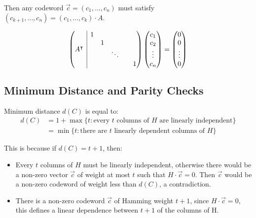 \documentclass[11pt]{article}
\begin{document}
Then any codeword $\overrightarrow{c} = (c_1, \ldots, c_n)$ must satisfy $(c_{k + 1}, \ldots, c_n) = (c_1, \ldots, c_k) \cdot A$.

\[
  \left( \begin{array}{@{}c|c@{}}
    A^\intercal &
     \begin{matrix}
        1 & & & \\
        & 1 & & \\
        & & \ddots & \\
        & & & & 1
     \end{matrix} 
  \end{array} \right)
  \begin{pmatrix}
    c_1 \\
    c_2 \\
    \vdots \\
    c_n
  \end{pmatrix}
  =
  \begin{pmatrix}
    0 \\
    0 \\
    \vdots \\
    0
  \end{pmatrix}
\]

\subsection{Minimum Distance and Parity Checks}
Minimum distance $d(C)$ is equal to:
\begin{align*}
  d(C) &= 1 + \max \{ t : \text{every } t \text{ columns of } H \text{ are linearly independent}\} \\
  &= \min\{t : \text{there are } t \text{ linearly dependent columns of } H\}
\end{align*}

This is because if $d(C) = t + 1$, then:
\begin{itemize}
  \item Every $t$ columns of $H$ must be linearly independent, otherwise there would be a non-zero vector $\overrightarrow{c}$ of weight at most $t$ such that $H \cdot \overrightarrow{c} = 0$.
    Then $\overrightarrow{c}$ would be a non-zero codeword of weight less than $d(C)$, a contradiction.
  \item There is a non-zero codeword $\overrightarrow{c}$ of Hamming weight $t + 1$, since $H \cdot \overrightarrow{c} = 0$, this defines a linear dependence between $t + 1$ of the columns of H.
\end{itemize}
\end{document}
